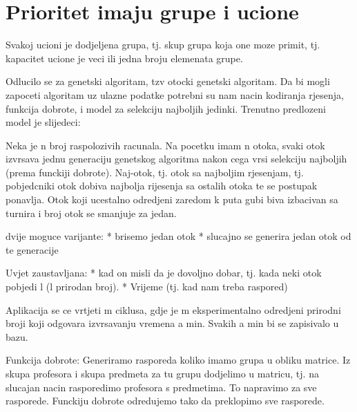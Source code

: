     \section{Prioritet imaju grupe i ucione}
    Svakoj ucioni je dodjeljena grupa, tj. skup grupa koja one moze primit, tj. kapacitet ucione je veci ili jedna broju elemenata grupe.


Odlucilo se za genetski algoritam, tzv otocki genetski algoritam. Da bi mogli zapoceti algoritam uz ulazne podatke potrebni su nam nacin kodiranja rjesenja, funkcija dobrote, i model za selekciju najboljih jedinki. Trenutno predlozeni model je slijedeci:

Neka je n broj raspolozivih racunala. Na pocetku imam n otoka, svaki otok izvrsava jednu generaciju genetskog algoritma nakon cega vrsi selekciju najboljih (prema funckiji dobrote). Naj-otok, tj. otok sa najboljim rjesenjam, tj. pobjedcniki otok dobiva najbolja rijesenja sa ostalih otoka te se postupak ponavlja. Otok koji ucestalno odredjeni zaredom k puta gubi biva izbacivan sa turnira i broj otok se smanjuje za jedan.

dvije moguce varijante:
* brisemo jedan otok
* slucajno se generira jedan otok od te generacije

Uvjet zaustavljana:
* kad on misli da je dovoljno dobar, tj. kada neki otok pobjedi l (l prirodan broj).
* Vrijeme (tj. kad nam treba raspored)

Aplikacija se ce vrtjeti m ciklusa, gdje je m eksperimentalno odredjeni prirodni broji koji odgovara izvrsavanju vremena a min. Svakih a min bi se zapisivalo u bazu.



Funkcija dobrote:
Generiramo rasporeda koliko imamo grupa u obliku matrice. Iz skupa profesora i skupa predmeta za tu grupu dodjelimo u matricu, tj. na slucajan nacin rasporedimo profesora s predmetima. To napravimo za sve rasporede. Funckiju dobrote odredujemo tako da preklopimo sve rasporede.
